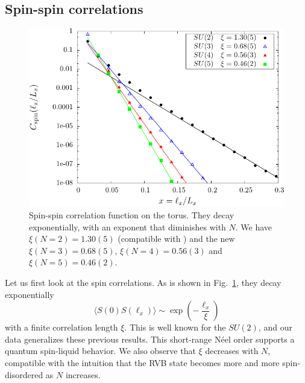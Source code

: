 \documentclass[11pt]{iopart}
\begin{document}
\subsection{Spin-spin correlations}
\label{sec:spinspin}
\begin{figure}[ht]
 \begin{center}
  \includegraphics{./figures/spin_corr.pdf}
 \end{center}
\caption{Spin-spin correlation function on the torus. They decay exponentially, with an exponent that diminishes with $N$. We have $\xi(N=2)=1.30(5)$ (compatible with \cite{RVB1}) and the new $\xi(N=3)=0.68(5)$, $\xi(N=4)=0.56(3)$ and $\xi(N=5)=0.46(2)$.}
\label{fig:corrspin_su2}
\end{figure}
Let us first look at the spin correlations. As is shown in Fig.~\ref{fig:corrspin_su2}, they decay exponentially
\begin{equation}
 \langle S(0)S(\ell_x) \rangle \sim \exp \left(-\frac{\ell_x}{\xi}\right)
\end{equation}
with a finite correlation length $\xi$. This is well known\cite{Doucot,RVB1} for the $SU(2)$, and our data generalizes these previous results. This short-range N\'eel order supports a quantum spin-liquid  behavior. We also observe that $\xi$ decreases with $N$, compatible with the intuition that the RVB state becomes more and more spin-disordered as $N$ increases.
\end{document}
